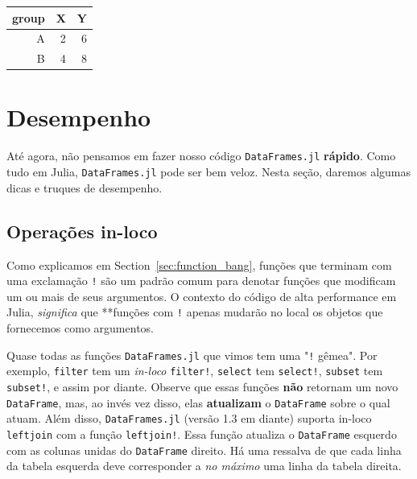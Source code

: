 \documentclass[
  notoc %
]{tufte-book}
\newcommand{\passthrough}[1]{#1}
\begin{document}
\begin{longtable}[]{@{}rrr@{}}
\toprule
group & X & Y \\
\midrule
\endhead
A & 2 & 6 \\
B & 4 & 8 \\
\bottomrule
\end{longtable}

\hypertarget{sec:df_performance}{%
\section{Desempenho}\label{sec:df_performance}}

Até agora, não pensamos em fazer nosso código
\passthrough{\lstinline!DataFrames.jl!} \textbf{rápido}. Como tudo em
Julia, \passthrough{\lstinline!DataFrames.jl!} pode ser bem veloz. Nesta
seção, daremos algumas dicas e truques de desempenho.

\hypertarget{sec:df_performance_inplace}{%
\subsection{Operações in-loco}\label{sec:df_performance_inplace}}

Como explicamos em Section~\ref{sec:function_bang}, funções que terminam
com uma exclamação \passthrough{\lstinline"!"} são um padrão comum para
denotar funções que modificam um ou mais de seus argumentos. O contexto
do código de alta performance em Julia, \emph{significa} que **funções
com \passthrough{\lstinline"!"} apenas mudarão no local os objetos que
fornecemos como argumentos.

Quase todas as funções \passthrough{\lstinline!DataFrames.jl!} que vimos
tem uma "\passthrough{\lstinline"!"} gêmea". Por exemplo,
\passthrough{\lstinline!filter!} tem um \emph{in-loco}
\passthrough{\lstinline"filter!"}, \passthrough{\lstinline!select!} tem
\passthrough{\lstinline"select!"}, \passthrough{\lstinline!subset!} tem
\passthrough{\lstinline"subset!"}, e assim por diante. Observe que essas
funções \textbf{não} retornam um novo
\passthrough{\lstinline!DataFrame!}, mas, ao invés vez disso, elas
\textbf{atualizam} o \passthrough{\lstinline!DataFrame!} sobre o qual
atuam. Além disso, \passthrough{\lstinline!DataFrames.jl!} (versão 1.3
em diante) suporta in-loco \passthrough{\lstinline!leftjoin!} com a
função \passthrough{\lstinline"leftjoin!"}. Essa função atualiza o
\passthrough{\lstinline!DataFrame!} esquerdo com as colunas unidas do
\passthrough{\lstinline!DataFrame!} direito. Há uma ressalva de que cada
linha da tabela esquerda deve corresponder a \emph{no máximo} uma linha
da tabela direita.
\end{document}
